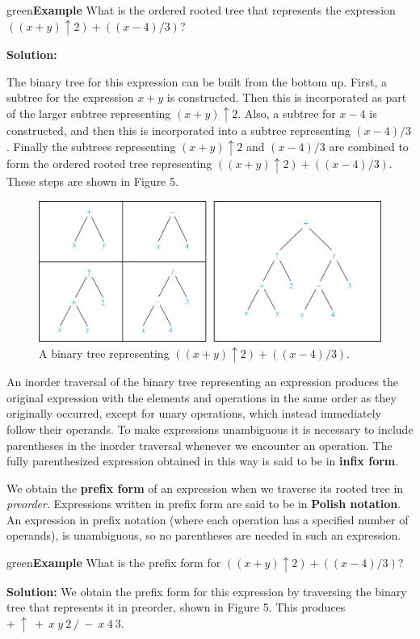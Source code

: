 \documentclass{article}
\newenvironment{example}{\begin{mybox}{green}{\textbf{Example}}}{\end{mybox}}
\begin{document}
\begin{example}
What is the ordered rooted tree that represents the expression $((x + y)↑2) + ((x - 4)/3)$?

\textbf{Solution:}

The binary tree for this expression can be built from the bottom up. First, a subtree for the expression $x + y$ is constructed. Then this is incorporated as part of the larger subtree representing $(x + y)↑2$. Also, a subtree for $x - 4$ is constructed, and then this is incorporated into a subtree representing $(x - 4)/3$. Finally the subtrees representing $(x + y) ↑ 2$ and $(x - 4)/3$ are combined to form the ordered rooted tree representing $((x + y) ↑ 2) + ((x - 4)/3)$. These steps are shown in Figure 5.
\end{example}

\begin{figure}[h!]
    \centering
    \includegraphics[width=.7\textwidth]{img/ch11.3-figure10.png}
    \caption{A binary tree representing $((x + y) ↑ 2) + ((x - 4)/3)$.}
    \label{fig:ch_11.3}
\end{figure}

An inorder traversal of the binary tree representing an expression produces the original expression with the elements and operations in the same order as they originally occurred, except for unary operations, which instead immediately follow their operands. To make expressions unambiguous it is necessary to include parentheses in the inorder traversal whenever we encounter an operation. The fully parenthesized expression obtained in this way is said to be in \textbf{infix form}.

We obtain the \textbf{prefix form} of an expression when we traverse its rooted tree in \textit{preorder}. Expressions written in prefix form are said to be in \textbf{Polish notation}. An expression in prefix notation (where each operation has a specified number of operands), is unambiguous, so no parentheses are needed in such an expression.

\begin{example}
What is the prefix form for $((x + y) ↑ 2) + ((x - 4)/3)$?

\textbf{Solution:}
We obtain the prefix form for this expression by traversing the binary tree that represents it in preorder, shown in Figure 5. This produces $+\ ↑\ +\ x\ y\ 2\ /\ -\ x\ 4\ 3$.
\end{example}
\end{document}
